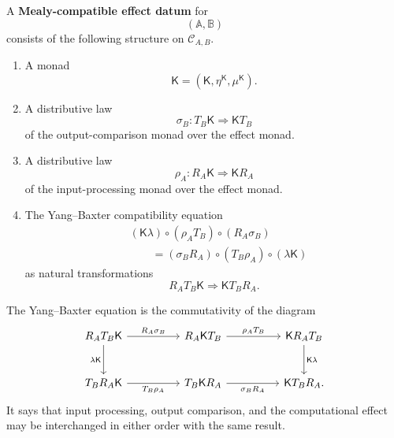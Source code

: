 \begin{definition}
\label{def:mealy-compatible-effect-datum}
    A \textbf{Mealy-compatible effect datum} for
    \[
        (\mathbb A,\mathbb B)
    \]
    consists of the following structure on
    \(\mathcal C_{A,B}\).

    \begin{enumerate}
        \item A monad
        \[
            \mathsf K
            =
            (\mathsf K,\eta^{\mathsf K},\mu^{\mathsf K}).
        \]

        \item A distributive law
        \[
            \sigma_B:
            T_B\mathsf K
            \Rightarrow
            \mathsf K T_B
        \]
        of the output-comparison monad over the effect monad.

        \item A distributive law
        \[
            \rho_A:
            R_A\mathsf K
            \Rightarrow
            \mathsf K R_A
        \]
        of the input-processing monad over the effect monad.

        \item The Yang--Baxter compatibility equation
        \begin{equation}
        \begin{aligned}
            &
            (\mathsf K\lambda)
            \circ
            (\rho_A T_B)
            \circ
            (R_A\sigma_B)
            \\
            &\qquad=
            (\sigma_B R_A)
            \circ
            (T_B\rho_A)
            \circ
            (\lambda\mathsf K)
        \end{aligned}
        \label{eq:effect-yang-baxter}
        \end{equation}
        as natural transformations
        \[
            R_AT_B\mathsf K
            \Rightarrow
            \mathsf K T_BR_A.
        \]
    \end{enumerate}
\end{definition}

The Yang--Baxter equation is the commutativity of the diagram
\[
    \begin{tikzcd}[column sep=huge, row sep=large]
            R_AT_B\mathsf K
                \arrow[r, "R_A\sigma_B"]
                \arrow[d, "\lambda\mathsf K"']
        &
            R_A\mathsf K T_B
                \arrow[r, "\rho_A T_B"]
        &
            \mathsf K R_AT_B
                \arrow[d, "\mathsf K\lambda"]
        \\
            T_BR_A\mathsf K
                \arrow[r, "T_B\rho_A"']
        &
            T_B\mathsf K R_A
                \arrow[r, "\sigma_B R_A"']
        &
            \mathsf K T_BR_A.
    \end{tikzcd}
\]
It says that input processing, output comparison, and the computational effect
may be interchanged in either order with the same result.

